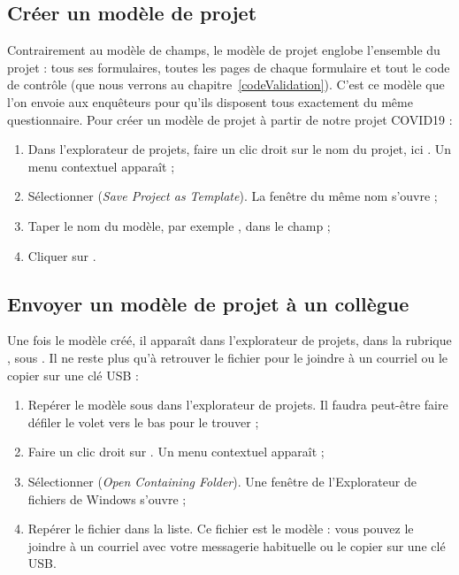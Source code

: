 
\subsection{Créer un modèle de projet}
\label{modeleProjet}

Contrairement au modèle de champs, le modèle de projet englobe l'ensemble du projet : tous ses formulaires, toutes les pages de chaque formulaire et tout le code de contrôle (que nous verrons au chapitre~\ref{codeValidation}). C'est ce modèle que l'on envoie aux enquêteurs pour qu'ils disposent tous exactement du même questionnaire. Pour créer un modèle de projet à partir de notre projet COVID19 :

\begin{enumerate}
	\item Dans l'explorateur de projets, faire un clic droit sur le nom du projet, ici . Un menu contextuel apparaît ;
	\item Sélectionner  (\emph{Save Project as Template}). La fenêtre du même nom s'ouvre ;
	\item Taper le nom du modèle, par exemple , dans le champ  ;
	\item Cliquer sur .
\end{enumerate}

\subsection{Envoyer un modèle de projet à un collègue}

Une fois le modèle créé, il apparaît dans l'explorateur de projets, dans la rubrique , sous . Il ne reste plus qu'à retrouver le fichier pour le joindre à un courriel ou le copier sur une clé USB :

\begin{enumerate}
	\item Repérer le modèle  sous  dans l'explorateur de projets. Il faudra peut-être faire défiler le volet vers le bas pour le trouver ;
	\item Faire un clic droit sur . Un menu contextuel apparaît ;
	\item Sélectionner  (\emph{Open Containing Folder}). Une fenêtre de l'Explorateur de fichiers de Windows s'ouvre ;
	\item Repérer le fichier  dans la liste. Ce fichier est le modèle : vous pouvez le joindre à un courriel avec votre messagerie habituelle ou le copier sur une clé USB.
\end{enumerate}


